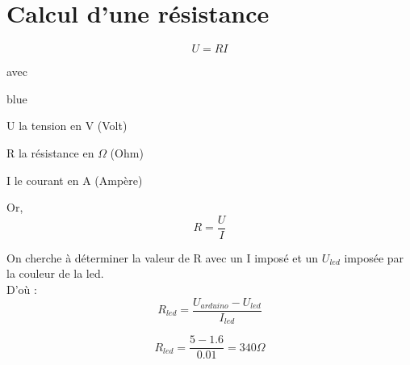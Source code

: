 \section{Calcul d'une résistance}


$$ U = RI $$

avec 

\begin{items}{blue}{\Triangle}
    \item U la tension en V (Volt)
    \item R la résistance en $\Omega$ (Ohm)
    \item I le courant en A (Ampère)
\end{items}

Or, 
$$ R = \frac{U}{I} $$

On cherche à déterminer la valeur de R avec un I imposé et un $U_{led}$ imposée par la couleur de la led. \\
D'où : 
$$ R_{led} = \frac{U_{arduino} - U_{led}}{I_{led}}$$

$$ R_{led} = \frac{5-1.6}{0.01} = 340 \Omega$$

